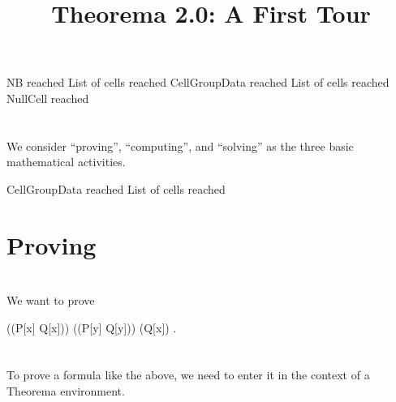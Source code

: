 \documentclass{article}
\newcommand{\light}[1]{{\color{lightgray}#1}}
\begin{document}
% 

\title{Theorema 2.0: A First Tour}
\author{}
\date{}
\maketitle

\light{NB reached} \light{List of cells reached} \light{CellGroupData reached} \light{List of cells reached} Null\light{Cell reached} \begingroup \section*{} We consider “proving”, “computing”, and “solving” as the three basic mathematical activities.\endgroup 

\light{CellGroupData reached} \light{List of cells reached} \section{Proving}

\begingroup \section*{} We want to prove\endgroup 

\begin{center}((P[x] \lor Q[x])) \land ((P[y] \Rightarrow Q[y])) \Leftrightarrow (Q[x]) .\end{center}
\begingroup \section*{} To prove a formula like the above, we need to enter it in the context of a Theorema environment.\endgroup 
\end{document}
